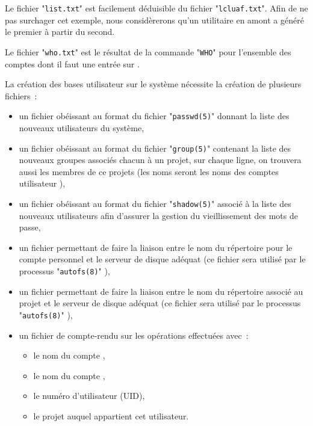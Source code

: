 \begin{remarque}
Le fichier "{\tt list.txt}" est facilement d{\'e}duisible du fichier
"{\tt lcluaf.txt}". Afin de ne pas surchager cet exemple, nous consid{\`e}rerons
qu'un utilitaire en amont a g{\'e}n{\'e}r{\'e} le premier {\`a} partir du second.
\end{remarque}

\begin{remarque}
Le fichier "{\tt who.txt}" est le r{\'e}sultat de la commande {\OpenVMS} "{\tt WHO}"
pour l'ensemble des comptes dont il faut une entr{\'e}e sur {\Unix}.
\end{remarque}

La cr{\'e}ation des bases utilisateur sur le syst{\`e}me {\Unix} n{\'e}cessite la cr{\'e}ation
de plusieurs fichiers~:
\begin{itemize}
	\item	un fichier ob{\'e}issant au format du fichier "{\tt passwd(5)}"
			donnant la liste des nouveaux utilisateurs du syst{\`e}me,
	\item	un fichier ob{\'e}issant au format du fichier "{\tt group(5)}"
			contenant la liste des nouveaux groupes associ{\'e}s chacun {\`a} un
			projet, sur chaque ligne, on trouvera aussi les membres de ce
			projets (les noms seront les noms des comptes utilisateur
			{\Unix}),
	\item	un fichier ob{\'e}issant au format du fichier "{\tt shadow(5)}"
			associ{\'e} {\`a} la liste des nouveaux utilisateurs afin d'assurer la
			gestion du vieillissement des mots de passe,
	\item	un fichier permettant de faire la liaison entre le nom du r{\'e}pertoire
			pour le compte personnel et le serveur de disque ad{\'e}quat (ce fichier
			sera utilis{\'e} par le processus "{\tt autofs(8)}" {\Unix}),
	\item	un fichier permettant de faire la liaison entre le nom du r{\'e}pertoire
			associ{\'e} au projet et le serveur de disque ad{\'e}quat (ce fichier
			sera utilis{\'e} par le processus "{\tt autofs(8)}" {\Unix}),
	\item	un fichier de compte-rendu sur les op{\'e}rations effectu{\'e}es avec~:
			\begin{itemize}
				\item	le nom du compte {\Unix},
				\item	le nom du compte {\OpenVMS},
				\item	le num{\'e}ro d'utilisateur {\Unix} (UID),
				\item	le projet auquel appartient cet utilisateur.
			\end{itemize}
\end{itemize}

